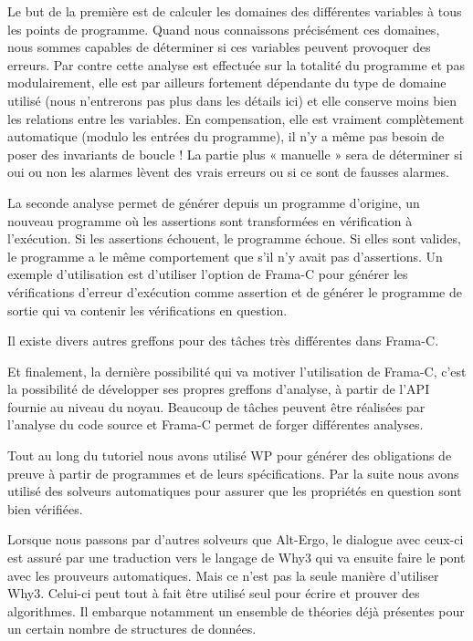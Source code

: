 Le but de la première est de calculer les domaines des différentes variables à
tous les points de programme. Quand nous connaissons précisément ces domaines,
nous sommes capables de déterminer si ces variables peuvent provoquer des erreurs.
Par contre cette analyse est effectuée sur la totalité du programme et pas 
modulairement, elle est par ailleurs fortement dépendante du type de domaine 
utilisé (nous n'entrerons pas plus dans les détails ici) et elle conserve moins
bien les relations entre les variables. En compensation, elle est vraiment 
complètement automatique (modulo les entrées du programme), il n'y a même pas
besoin de poser des invariants de boucle ! La partie plus « manuelle » sera de
déterminer si oui ou non les alarmes lèvent des vrais erreurs ou si ce sont de
fausses alarmes.



La seconde analyse permet de générer depuis un programme d'origine, un nouveau
programme où les assertions sont transformées en vérification à l'exécution. Si
les assertions échouent, le programme échoue. Si elles sont valides, le programme
a le même comportement que s'il n'y avait pas d'assertions. Un exemple 
d'utilisation est d'utiliser l'option  de Frama-C pour générer les 
vérifications d'erreur d'exécution comme assertion et de générer le programme de 
sortie qui va contenir les vérifications en question.



Il existe divers autres greffons pour des tâches très différentes dans Frama-C.


Et finalement, la dernière possibilité qui va motiver l'utilisation de Frama-C,
c'est la possibilité de développer ses propres greffons d'analyse, à partir de
l'API fournie au niveau du noyau. Beaucoup de tâches peuvent être réalisées par
l'analyse du code source et Frama-C permet de forger différentes analyses.





Tout au long du tutoriel nous avons utilisé WP pour générer des obligations de 
preuve à partir de programmes et de leurs spécifications. Par la suite nous avons
utilisé des solveurs automatiques pour assurer que les propriétés en question sont
bien vérifiées.



Lorsque nous passons par d'autres solveurs que Alt-Ergo, le dialogue avec ceux-ci
est assuré par une traduction vers le langage de Why3 qui va ensuite faire le pont
avec les prouveurs automatiques. Mais ce n'est pas la seule manière d'utiliser 
Why3. Celui-ci peut tout à fait être utilisé seul pour écrire et prouver des
algorithmes. Il embarque notamment un ensemble de théories déjà présentes pour un
certain nombre de structures de données.



